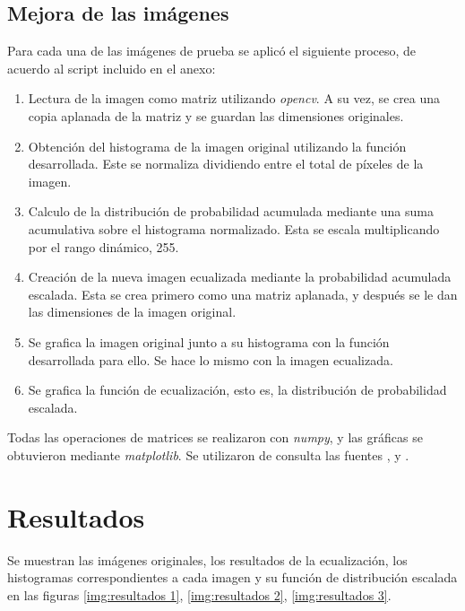 \documentclass[12pt]{article}
\begin{document}
\subsection{Mejora de las imágenes}
Para cada una de las imágenes de prueba se aplicó el siguiente proceso, de acuerdo al script incluido en el anexo:
	\begin{enumerate}
	\item Lectura de la imagen como matriz utilizando \textit{opencv}. A su vez, se crea una copia aplanada de la matriz y se guardan las dimensiones originales.
	
	\item Obtención del histograma de la imagen original utilizando la función desarrollada. Este se normaliza dividiendo entre el total de píxeles de la imagen.
	
	\item Calculo de la distribución de probabilidad acumulada mediante una suma acumulativa sobre el histograma normalizado. Esta se escala multiplicando por el rango dinámico, 255.
	
	\item Creación de la nueva imagen ecualizada mediante la probabilidad acumulada escalada. Esta se crea primero como una matriz aplanada, y después se le dan las dimensiones de la imagen original.
	
	\item Se grafica la imagen original junto a su histograma con la función desarrollada para ello. Se hace lo mismo con la imagen ecualizada.
	
	\item Se grafica la función de ecualización, esto es, la distribución de probabilidad escalada. 
	\end{enumerate}

Todas las operaciones de matrices se realizaron con \textit{numpy}, y las gráficas se obtuvieron mediante \textit{matplotlib}. Se utilizaron de consulta las fuentes \cite{SolemsVisionBlog2015}, \cite{karnewarBacktobasicsPart12018} y \cite{walkerHistogramEqualizationPython2023}.

\section{Resultados}
Se muestran las imágenes originales, los resultados de la ecualización, los histogramas correspondientes a cada imagen y su función de distribución escalada en las figuras \ref{img:resultados 1}, \ref{img:resultados 2}, \ref{img:resultados 3}.  
\end{document}

